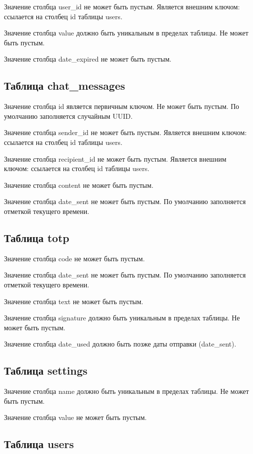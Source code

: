 Значение столбца user\_id не может быть пустым. Является внешним ключом: ссылается на столбец id таблицы users.

Значение столбца value должно быть уникальным в пределах таблицы. Не может быть пустым.

Значение столбца date\_expired не может быть пустым.

\subsection{Таблица chat\_messages}

Значение столбца id является первичным ключом. Не может быть пустым. По умолчанию заполняется случайным UUID.

Значение столбца sender\_id не может быть пустым. Является внешним ключом: ссылается на столбец id таблицы users.

Значение столбца recipient\_id не может быть пустым. Является внешним ключом: ссылается на столбец id таблицы users.

Значение столбца content не может быть пустым.

Значение столбца date\_sent не может быть пустым. По умолчанию заполняется отметкой текущего времени.

\subsection{Таблица totp}

Значение столбца code не может быть пустым.

Значение столбца date\_sent не может быть пустым. По умолчанию заполняется отметкой текущего времени.

Значение столбца text не может быть пустым.

Значение столбца signature должно быть уникальным в пределах таблицы. Не может быть пустым.

Значение столбца date\_used должно быть позже даты отправки (date\_sent).

\subsection{Таблица settings}

Значение столбца name должно быть уникальным в пределах таблицы. Не может быть пустым.

Значение столбца value не может быть пустым.

\subsection{Таблица users}

